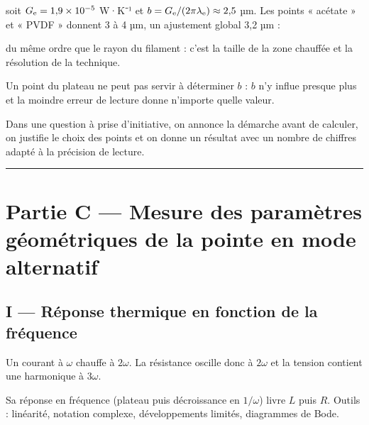 \documentclass[11pt,a4paper]{article}
\newcommand{\equationajustee}[1]{%
  \sbox{\boiteequation}{$\displaystyle #1$}%
  \ifdim\wd\boiteequation>\linewidth
    \[\resizebox{\linewidth}{!}{\usebox{\boiteequation}}\]%
  \else
    \[#1\]%
  \fi}
\begin{document}
soit \(G_{\rm e}=1{,}9\times10^{-5}\) W·K⁻¹ et \(b=G_{\rm e}/(2\pi\lambda_{\rm e})\approx2{,}5\) µm. Les points « acétate » et « PVDF » donnent 3 à 4 µm, un ajustement global 3,2 µm :

\equationajustee{\boxed{b\approx3\ \mu\mathrm m}}

du même ordre que le rayon du filament : c'est la taille de la zone chauffée et la résolution de la technique.

\begin{piege}

Un point du plateau ne peut pas servir à déterminer \(b\) : \(b\) n'y influe presque plus et la moindre erreur de lecture donne n'importe quelle valeur.

\end{piege}

\begin{jury}

Dans une question à prise d'initiative, on annonce la démarche avant de calculer, on justifie le choix des points et on donne un résultat avec un nombre de chiffres adapté à la précision de lecture.

\end{jury}

\begin{center}\rule{0.5\linewidth}{0.5pt}\end{center}

\hypertarget{partie-c-mesure-des-paramuxe8tres-guxe9omuxe9triques-de-la-pointe-en-mode-alternatif}{%
\section{Partie C --- Mesure des paramètres géométriques de la pointe en mode alternatif}\label{partie-c-mesure-des-paramuxe8tres-guxe9omuxe9triques-de-la-pointe-en-mode-alternatif}}

\hypertarget{i-ruxe9ponse-thermique-en-fonction-de-la-fruxe9quence}{%
\subsection{I --- Réponse thermique en fonction de la fréquence}\label{i-ruxe9ponse-thermique-en-fonction-de-la-fruxe9quence}}

Un courant à \(\omega\) chauffe à \(2\omega\). La résistance oscille donc à \(2\omega\) et la tension contient une harmonique à \(3\omega\).

Sa réponse en fréquence (plateau puis décroissance en \(1/\omega\)) livre \(L\) puis \(R\). Outils : linéarité, notation complexe, développements limités, diagrammes de Bode.
\end{document}

